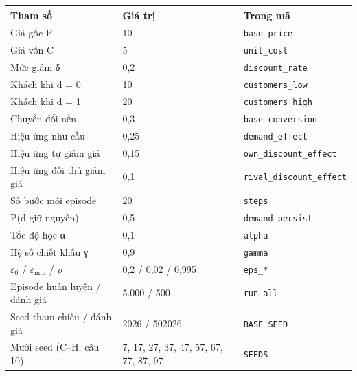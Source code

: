 \begin{tabular}{llL{4.2cm}}
\toprule
Tham số & Giá trị & Trong mã \\
\midrule
Giá gốc P & 10 & \texttt{base\_price} \\
Giá vốn C & 5 & \texttt{unit\_cost} \\
Mức giảm δ & 0{,}2 & \texttt{discount\_rate} \\
Khách khi d = 0 & 10 & \texttt{customers\_low} \\
Khách khi d = 1 & 20 & \texttt{customers\_high} \\
Chuyển đổi nền & 0{,}3 & \texttt{base\_conversion} \\
Hiệu ứng nhu cầu & 0{,}25 & \texttt{demand\_effect} \\
Hiệu ứng tự giảm giá & 0{,}15 & \texttt{own\_discount\_effect} \\
Hiệu ứng đối thủ giảm giá & 0{,}1 & \texttt{rival\_discount\_effect} \\
Số bước mỗi episode & 20 & \texttt{steps} \\
P(d giữ nguyên) & 0{,}5 & \texttt{demand\_persist} \\
Tốc độ học α & 0{,}1 & \texttt{alpha} \\
Hệ số chiết khấu γ & 0{,}9 & \texttt{gamma} \\
$\varepsilon_0$ / $\varepsilon_{\min}$ / $\rho$ & 0{,}2 / 0{,}02 / 0{,}995 & \texttt{eps\_*} \\
Episode huấn luyện / đánh giá & 5{.}000 / 500 & \texttt{run\_all} \\
Seed tham chiếu / đánh giá & 2026 / 502026 & \texttt{BASE\_SEED} \\
Mười seed (C–H, câu 10) & 7, 17, 27, 37, 47, 57, 67, 77, 87, 97 & \texttt{SEEDS} \\
\bottomrule
\end{tabular}
